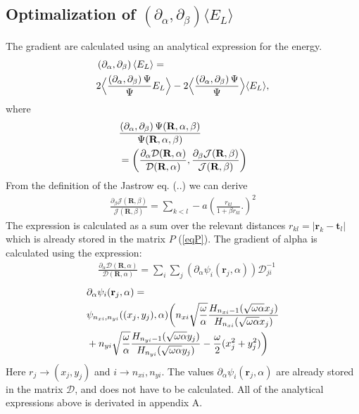 \documentclass[a4paper,10pt,twocolumn]{article} %
\newcommand{\ts}[1]{\textbf{#1}}
\newcommand{\expec}[1]{\langle{}{#1}\rangle{}}
\begin{document}
\subsection{Optimalization of $(\partial_\alpha,\partial_\beta)\expec{E_L}$}%
The gradient are calculated using an analytical expression for the energy. 
\cite{lin_2000}
\begin{align}
	&\left({\partial_\alpha},{\partial_\beta}\right) \expec{E_L} = \notag\\
		&2\Big\langle\frac{\left({\partial_\alpha},{\partial_\beta}\right)\Psi}{\Psi} E_L\Big\rangle
		-2\Big\langle\frac{\left({\partial_\alpha},{\partial_\beta}\right)\Psi}{\Psi}\Big\rangle\expec{E_L}\label{abgd},
\end{align}
where
\begin{align}
	&\frac{\left({\partial_\alpha},{\partial_\beta}\right) \Psi(\ts R,\alpha,\beta)}{\Psi(\ts R,\alpha,\beta)}\notag\\
	&= 	\left(\frac{\partial_\alpha \mathcal D(\ts R,\alpha)}{\mathcal D(\ts R,\alpha)}
	, 	\frac{{\partial_\beta} \mathcal J(\ts R,\beta)}{\mathcal J(\ts R,\beta)}\right)
\end{align}
From the definition of the Jastrow eq. (..) we can derive
\begin{align}
	\frac{\partial_\beta \mathcal J(\ts R,\beta)}{ \mathcal J(\ts R,\beta)}=\sum_{k<l}-a
\left( 
	\frac {r_{kl}} {1+\beta r_{kl}}.
\right)^2
\end{align}
The expression is calculated as a sum over the relevant distances $r_{kl}=|\ts r_k-\ts t_l|$ which is already stored in the matrix $P$ (\ref{eqP}).
The gradient of alpha is calculated using the expression:
\begin{align}
	&\frac{\partial_\alpha \mathcal D(\ts R,\alpha)}{\mathcal D(\ts R,\alpha)}=\sum_i\sum_j(\partial_\alpha \psi_i(\ts r_j,\alpha)) \mathcal D^{-1}_{ji} %
\end{align}
\begin{align}
	&\partial_\alpha \psi_i(\ts r_j,\alpha)=\notag\\
	&\psi_{n_{xi},n_{yi}}((x_j,y_j),\alpha)
	\bigg(
	 	n_{xi} \sqrt{\frac\omega\alpha} \frac{H_{n_{xi}-1}(\sqrt{\omega\alpha}x_j)}{H_{n_{xi}}(\sqrt{\omega\alpha}x_j)}\notag\\
	 	&+n_{yi} \sqrt{\frac\omega\alpha} \frac{H_{n_{yi}-1}(\sqrt{\omega\alpha}y_j)}{H_{n_{yi}}(\sqrt{\omega\alpha}y_j)}
		-\frac{\omega}2(x_j^2+y_j^2)
	\bigg)
\end{align}
Here $r_j\to(x_j,y_j)$ and $i\to n_{xi},n_{yi}$.  
The values 	$\partial_\alpha \psi_i(\ts r_j,\alpha)$ are already stored in the matrix $\mathcal D$, and does not have to be calculated. 
All of the analytical expressions above is derivated in appendix A.
\end{document}
